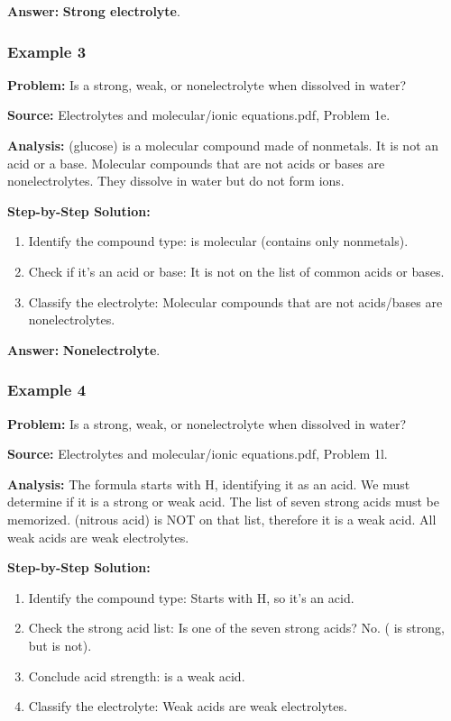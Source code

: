 \documentclass{article}
\begin{document}
\textbf{Answer:} \textbf{Strong electrolyte}.

\subsubsection{Example 3}
\textbf{Problem:} Is  a strong, weak, or nonelectrolyte when dissolved in water?

\textbf{Source:} Electrolytes and molecular/ionic equations.pdf, Problem 1e.

\textbf{Analysis:}  (glucose) is a molecular compound made of nonmetals. It is not an acid or a base. Molecular compounds that are not acids or bases are nonelectrolytes. They dissolve in water but do not form ions.

\textbf{Step-by-Step Solution:}
\begin{enumerate}
    \item Identify the compound type:  is molecular (contains only nonmetals).
    \item Check if it's an acid or base: It is not on the list of common acids or bases.
    \item Classify the electrolyte: Molecular compounds that are not acids/bases are nonelectrolytes.
\end{enumerate}

\textbf{Answer:} \textbf{Nonelectrolyte}.

\subsubsection{Example 4}
\textbf{Problem:} Is  a strong, weak, or nonelectrolyte when dissolved in water?

\textbf{Source:} Electrolytes and molecular/ionic equations.pdf, Problem 1l.

\textbf{Analysis:} The formula  starts with H, identifying it as an acid. We must determine if it is a strong or weak acid. The list of seven strong acids must be memorized.  (nitrous acid) is NOT on that list, therefore it is a weak acid. All weak acids are weak electrolytes.

\textbf{Step-by-Step Solution:}
\begin{enumerate}
    \item Identify the compound type: Starts with H, so it's an acid.
    \item Check the strong acid list: Is  one of the seven strong acids? No. ( is strong, but  is not).
    \item Conclude acid strength:  is a weak acid.
    \item Classify the electrolyte: Weak acids are weak electrolytes.
\end{enumerate}
\end{document}
